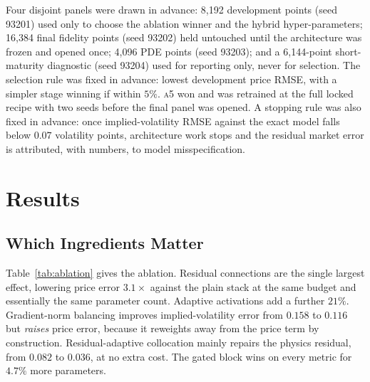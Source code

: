 \documentclass[conference]{IEEEtran}
\begin{document}
Four disjoint panels were drawn in advance: 8,192 development points (seed
93201) used only to choose the ablation winner and the hybrid
hyper-parameters; 16,384 final fidelity points (seed 93202) held untouched
until the architecture was frozen and opened once; 4,096 PDE points (seed
93203); and a 6,144-point short-maturity diagnostic (seed 93204) used for
reporting only, never for selection. The selection rule was fixed in advance:
lowest development price RMSE, with a simpler stage winning if within $5\%$.
\textsc{a5} won and was retrained at the full locked recipe with two seeds
before the final panel was opened. A stopping rule was also fixed in advance:
once implied-volatility RMSE against the exact model falls below $0.07$
volatility points, architecture work stops and the residual market error is
attributed, with numbers, to model misspecification.

\section{Results}

\subsection{Which Ingredients Matter}

Table~\ref{tab:ablation} gives the ablation. Residual connections are the
single largest effect, lowering price error $3.1\times$ against the plain stack
at the same budget and essentially the same parameter count. Adaptive
activations add a further $21\%$. Gradient-norm balancing improves
implied-volatility error from $0.158$ to $0.116$ but \emph{raises} price error,
because it reweights away from the price term by construction.
Residual-adaptive collocation mainly repairs the physics residual, from
$0.082$ to $0.036$, at no extra cost. The gated block wins on every metric for
$4.7\%$ more parameters.
\end{document}
